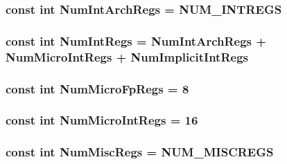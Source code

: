 \label{namespaceX86ISA_a7e051dc96074ceadda53ac54735a2181}
\hypertarget{namespaceX86ISA_a405c0abe85dc0da846c120e3b31f375c}{
\subsubsection[{NumIntArchRegs}]{\setlength{\rightskip}{0pt plus 5cm}const int {\bf NumIntArchRegs} = NUM\_\-INTREGS}}
\label{namespaceX86ISA_a405c0abe85dc0da846c120e3b31f375c}
\hypertarget{namespaceX86ISA_a9c412b5118ce369570c156c4e156638a}{
\subsubsection[{NumIntRegs}]{\setlength{\rightskip}{0pt plus 5cm}const int {\bf NumIntRegs} = {\bf NumIntArchRegs} + {\bf NumMicroIntRegs} + {\bf NumImplicitIntRegs}}}
\label{namespaceX86ISA_a9c412b5118ce369570c156c4e156638a}
\hypertarget{namespaceX86ISA_aa4e351caf21c98a06534828e60df47fc}{
\subsubsection[{NumMicroFpRegs}]{\setlength{\rightskip}{0pt plus 5cm}const int {\bf NumMicroFpRegs} = 8}}
\label{namespaceX86ISA_aa4e351caf21c98a06534828e60df47fc}
\hypertarget{namespaceX86ISA_a985912475a96ec00a4ff48b39004d43a}{
\subsubsection[{NumMicroIntRegs}]{\setlength{\rightskip}{0pt plus 5cm}const int {\bf NumMicroIntRegs} = 16}}
\label{namespaceX86ISA_a985912475a96ec00a4ff48b39004d43a}
\hypertarget{namespaceX86ISA_a568d4aa96dd7cd963f3b1b1b0446c9c6}{
\subsubsection[{NumMiscRegs}]{\setlength{\rightskip}{0pt plus 5cm}const int {\bf NumMiscRegs} = NUM\_\-MISCREGS}}
\label{namespaceX86ISA_a568d4aa96dd7cd963f3b1b1b0446c9c6}
